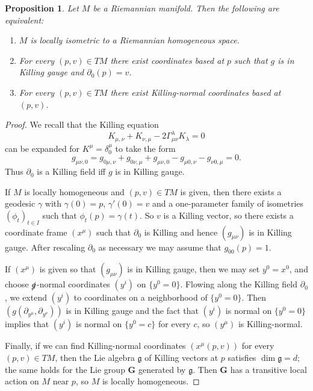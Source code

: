 \documentclass[reqno,12pt,letterpaper]{amsart}
\newcommand{\Group}{\mathbf G}
\newtheorem{proposition}[theorem]{Proposition}
\theoremstyle{definition}
\numberwithin{equation}{section}
\begin{document}
\begin{proposition}
Let $M$ be a Riemannian manifold. Then the following are equivalent:
\begin{enumerate}
\item $M$ is locally isometric to a Riemannian homogeneous space.
\item For every $(p, v) \in TM$ there exist coordinates based at $p$ such that $g$ is in Killing gauge and $\partial_0(p) = v$.
\item For every $(p, v) \in TM$ there exist Killing-normal coordinates based at $(p, v)$.
\end{enumerate}
\end{proposition}
\begin{proof}
We recall that the Killing equation
$$K_{\mu,\nu} + K_{\nu,\mu} - 2\Gamma^\lambda_{\mu\nu} K_\lambda = 0$$
can be expanded for $K^\mu = \delta_0^\mu$ to take the form
$$g_{\mu \nu, 0} =  g_{0 \mu, \nu} + g_{0 \nu, \mu} + g_{\mu \nu, 0} - g_{\mu 0, \nu} - g_{\nu 0, \mu} = 0.$$
Thus $\partial_0$ is a Killing field iff $g$ is in Killing gauge.

If $M$ is locally homogeneous and $(p, v) \in TM$ is given, then there exists a geodesic $\gamma$ with $\gamma(0) = p$, $\gamma'(0) = v$ and a one-parameter family of isometries $(\phi_t)_{t \in I}$ such that $\phi_t(p) = \gamma(t)$.
So $v$ is a Killing vector, so there exists a coordinate frame $(x^\mu)$ such that $\partial_0$ is Killing and hence $(g_{\mu\nu})$ is in Killing gauge.
After rescaling $\partial_0$ as necessary we may assume that $g_{00}(p) = 1$.

If $(x^\mu)$ is given so that $(g_{\mu\nu})$ is in Killing gauge, then we may set $y^0 = x^0$, and choose $\slashed g$-normal coordinates $(y^i)$ on $\{y^0 = 0\}$.
Flowing along the Killing field $\partial_0$, we extend $(y^i)$ to coordinates on a neighborhood of $\{y^0 = 0\}$.
Then $(g(\partial_{y^\mu}, \partial_{y^\nu}))$ is in Killing gauge and the fact that $(y^i)$ is normal on $\{y^0 = 0\}$ implies that $(y^i)$ is normal on $\{y^0 = c\}$ for every $c$, so $(y^\mu)$ is Killing-normal.

Finally, if we can find Killing-normal coordinates $(x^\mu(p, v))$ for every $(p, v) \in TM$, then the Lie algebra $\mathfrak g$ of Killing vectors at $p$ satisfies $\dim \mathfrak g = d$; the same holds for the Lie group $\Group$ generated by $\mathfrak g$.
Then $\Group$ has a transitive local action on $M$ near $p$, so $M$ is locally homogeneous.
\end{proof}
\end{document}
